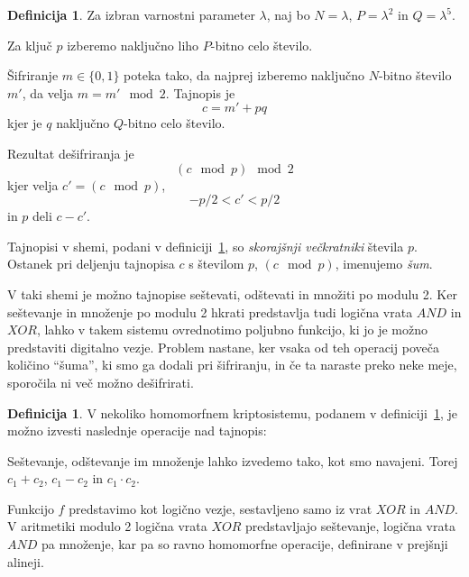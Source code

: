 \documentclass[12pt,a4paper,openany,tikz]{book}
\theoremstyle{plain}
\theoremstyle{definition}
\newtheorem{defn}[thm]{Definicija} %
\begin{document}
\begin{mdframed}[frametitle=Nekoliko homomorfen kriptosistem]
  \begin{defn} Za izbran varnostni parameter $\lambda$, naj bo $N=\lambda$, $P=\lambda^2$ in $Q=\lambda^5$.
    \begin{description}[style=nextline]
      \item[Generiranje ključa - $KeyGen$]Za ključ $p$ izberemo naključno liho $P$-bitno celo število.
      \item[Šifriranje - $e_k(m)$]Šifriranje $m \in {\{}0,1{\}}$ poteka tako, da najprej izberemo naključno $N$-bitno število $m'$, da velja $m = m' \mod 2$. Tajnopis je $$c=m'+pq$$ kjer je $q$ naključno $Q$-bitno celo število.
      \item[Dešifriranje - $d_k(m)$]Rezultat dešifriranja je $$(c \mod p) \mod 2$$ kjer velja $c'=(c \mod p)$, $$-p/2 < c' < p/2$$ in $p$ deli $c-c'$.
    \end{description}
    \label{def:swhe}
  \end{defn}
\end{mdframed}

Tajnopisi v shemi, podani v definiciji~\ref{def:swhe}, so \textit{skorajšnji večkratniki} števila $p$. Ostanek pri deljenju tajnopisa $c$ s številom $p$, $(c \mod p)$, imenujemo \textit{šum}.

V taki shemi je možno tajnopise seštevati, odštevati in množiti po modulu 2. Ker seštevanje in množenje po modulu 2 hkrati predstavlja tudi logična vrata $AND$ in $XOR$, lahko v takem sistemu ovrednotimo poljubno funkcijo, ki jo je možno predstaviti digitalno vezje. Problem nastane, ker vsaka od teh operacij poveča količino ``šuma'', ki smo ga dodali pri šifriranju, in če ta naraste preko neke meje, sporočila ni več možno dešifrirati.

\begin{mdframed}[frametitle=Homomorfne operacije]
  \begin{defn} V nekoliko homomorfnem kriptosistemu, podanem v definiciji~\ref{def:swhe}, je možno izvesti naslednje operacije nad tajnopis:
    \begin{description}[style=nextline]
      \item[Add($c_1$, $c_2$), Sub($c_1$, $c_2$), Mult($c_1$, $c_2$)]Seštevanje, odštevanje im množenje lahko izvedemo tako, kot smo navajeni. Torej $c_1+c_2$, $c_1-c_2$ in $c_1 \cdot c_2$.
      \item[Ovrednotenje - $Evaluate(f, c_1, \ldots, c_t)$] Funkcijo $f$ predstavimo kot logično vezje, sestavljeno samo iz vrat $XOR$ in $AND$. V aritmetiki modulo 2 logična vrata $XOR$ predstavljajo seštevanje, logična vrata $AND$ pa množenje, kar pa so ravno homomorfne operacije, definirane v prejšnji alineji.
    \end{description}
    \label{def:swheops}
  \end{defn}
\end{mdframed}
\end{document}
